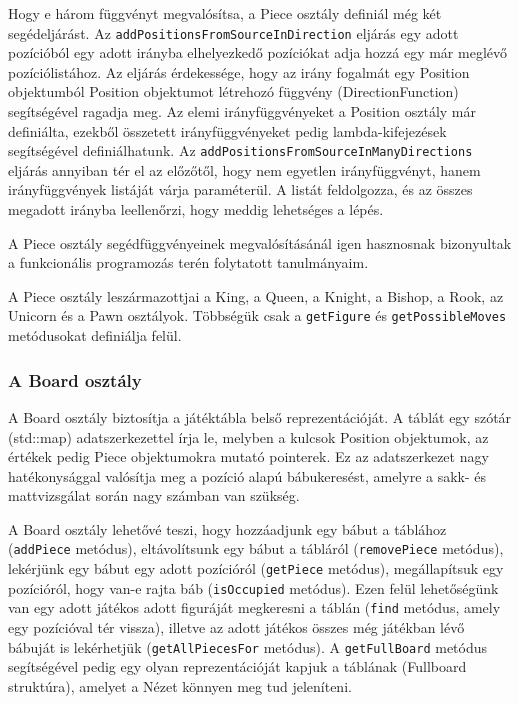 \documentclass[12pt, twoside]{report}
\begin{document}
\begin{itemize}
	Hogy e három függvényt megvalósítsa, a Piece osztály definiál még két segédeljárást.
	\subitem Az {\tt addPositionsFromSourceInDirection} eljárás egy adott pozícióból egy adott irányba elhelyezkedő pozíciókat adja hozzá egy már meglévő pozíciólistához. Az eljárás érdekessége, hogy az irány fogalmát egy Position objektumból Position objektumot létrehozó függvény (DirectionFunction) segítségével ragadja meg. Az elemi irányfüggvényeket a Position osztály már definiálta, ezekből összetett irányfüggvényeket pedig lambda-kifejezések segítségével definiálhatunk.
	\subitem Az {\tt addPositionsFromSourceInManyDirections} eljárás annyiban tér el az előzőtől, hogy nem egyetlen irányfüggvényt, hanem irányfüggvények listáját várja paraméterül. A listát feldolgozza, és az összes megadott irányba leellenőrzi, hogy meddig lehetséges a lépés.
\end{itemize}
A Piece osztály segédfüggvényeinek megvalósításánál igen hasznosnak bizonyultak a funkcionális programozás terén folytatott tanulmányaim.

A Piece osztály leszármazottjai a King, a Queen, a Knight, a Bishop, a Rook, az Unicorn és a Pawn osztályok. Többségük csak a {\tt getFigure} és {\tt getPossibleMoves} metódusokat definiálja felül.

\subsubsection{A Board osztály}

A Board osztály biztosítja a játéktábla belső reprezentációját. A táblát egy szótár (std::map) adatszerkezettel írja le, melyben a kulcsok Position objektumok, az értékek pedig Piece objektumokra mutató pointerek. Ez az adatszerkezet nagy hatékonysággal valósítja meg a pozíció alapú bábukeresést, amelyre a sakk- és mattvizsgálat során nagy számban van szükség.

A Board osztály lehetővé teszi, hogy hozzáadjunk egy bábut a táblához ({\tt addPiece} metódus), eltávolítsunk egy bábut a tábláról ({\tt removePiece} metódus), lekérjünk egy bábut egy adott pozícióról ({\tt getPiece} metódus), megállapítsuk egy pozícióról, hogy van-e rajta báb ({\tt isOccupied} metódus). Ezen felül lehetőségünk van egy adott játékos adott figuráját megkeresni a táblán ({\tt find} metódus, amely egy pozícióval tér vissza), illetve az adott játékos összes még játékban lévő bábuját is lekérhetjük ({\tt getAllPiecesFor} metódus). A {\tt getFullBoard} metódus segítségével pedig egy olyan reprezentációját kapjuk a táblának (Fullboard struktúra), amelyet a Nézet könnyen meg tud jeleníteni.
\end{document}
